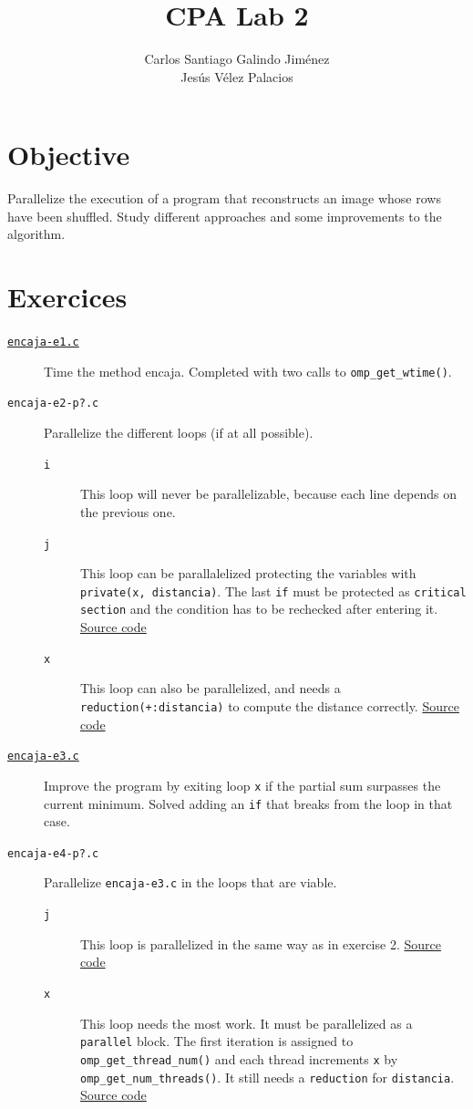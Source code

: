 \documentclass[a4paper]{article}
\title{CPA Lab 2}
\author{Carlos Santiago Galindo Jiménez\\Jesús Vélez Palacios}
\newcommand{\github}{https://github.com/kauron/etsinf3/tree/master/CPA/lab2}
\begin{document}
\maketitle
\section{Objective}
Parallelize the execution of a program that reconstructs an image whose rows have been shuffled. Study different approaches and some improvements to the algorithm.

\section{Exercices}
\begin{description}
    \item [\texttt{\href{\github /src/encaja-e1.c\#L167}{encaja-e1.c}}] Time the method encaja. Completed with two calls to \texttt{omp\_get\_wtime()}.
    \item [\texttt{encaja-e2-p?.c}] Parallelize the different loops (if at all possible).
    \begin{description}
        \item [\texttt{i}] This loop will never be parallelizable, because each line depends on the previous one.
        \item [\texttt{j}] This loop can be parallalelized protecting the variables with \texttt{private(x, distancia)}. The last \texttt{if} must be protected as \texttt{critical section} and the condition has to be rechecked after entering it. \href{\github /src/encaja-e2-pJ.c\#L118}{Source code}
        \item [\texttt{x}] This loop can also be parallelized, and needs a \texttt{reduction(+:distancia)} to compute the distance correctly. \href{\github /src/encaja-e2-pX.c\#L120}{Source code}
    \end{description}
    \item [\texttt{\href{\github /src/encaja-e3.c\#L122}{encaja-e3.c}}] Improve the program by exiting loop \texttt{x} if the partial sum surpasses the current minimum. Solved adding an \texttt{if} that breaks from the loop in that case.
    \item [\texttt{encaja-e4-p?.c}] Parallelize \texttt{encaja-e3.c} in the loops that are viable.
    \begin{description}
        \item [\texttt{j}] This loop is parallelized in the same way as in exercise 2. \href{\github /src/encaja-e4-pJ.c\#L118}{Source code}
        \item [\texttt{x}] This loop needs the most work. It must be parallelized as a \texttt{parallel} block. The first iteration is assigned to \texttt{omp\_get\_thread\_num()} and each thread increments \texttt{x} by \texttt{omp\_get\_num\_threads()}. It still needs a \texttt{reduction} for \texttt{distancia}. \href{\github /src/encaja-e4-pX.c}{Source code}
    \end{description}
\end{description}
\end{document}
